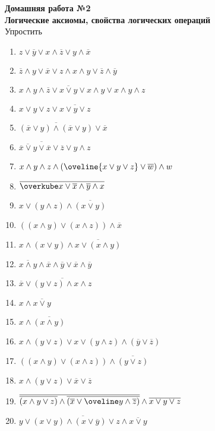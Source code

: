 



    \begin{center}
        \textbf{Домашняя работа №2 \\Логические аксиомы, свойства логических операций}\\
        Упростить
    \end{center}

    \begin{enumerate}
        \item $z \vee \overline y \vee x \wedge \overline z \vee y \wedge \overline x$
        \item $\overline z \wedge y \vee \overline x \vee z \wedge x \wedge y \vee \overline z \wedge \overline y$
        \item $x \wedge y \wedge \overline z \vee \overline{x \vee y} \vee x \wedge y \vee  x \wedge y \wedge z$
        \item $x \vee y \vee z \vee \overline{x \vee y \vee z}$
        \item $\overline{(\overline x \vee y) \wedge (\overline x \vee y)} \vee \overline x$
        \item $\overline{\overline{\overline x \vee y} \vee \overline x \vee \overline z} \vee y \wedge z$
        \item $x \wedge y \wedge z \wedge (\oveline{x \vee y \vee z} \vee \overline w) \wedge w$
        \item $\overline{\overkube x \vee \overline x \wedge \overline y \wedge x}$
        \item $x \vee (y \wedge z) \wedge \overline {(x \vee y)}$
        \item $((x \wedge y) \vee (x \wedge z)) \wedge \overline x$
        \item $x \wedge (x \vee y) \wedge \overline{x \vee (x \wedge y)}$
        \item $\overline {x \wedge y} \wedge \overline x \wedge \overline y \vee \overline x \wedge \overline y$
        \item $\overline x \vee \overline{(y \vee z) \wedge x \wedge z}$
        \item $x \wedge \overline {x \vee y}$
        \item $x \wedge \overline{(x \wedge y)}$
        \item $x \wedge (y \vee z) \vee x \vee (y \wedge z) \wedge (\overline y \vee \overline z)$
        \item $((x \wedge y) \vee (x \wedge z)) \wedge \overline{(y \vee z)}$
        \item $x \wedge (y \vee z) \vee \overline x \vee \overline z$
        \item $\overline{\overline{(x \wedge y \vee z)} \wedge \overline{(\overline x \vee \oveline y \wedge \overline z)}} \wedge \overline{x \vee y \vee z}$
        \item $\overline{y \vee (x \vee y) \wedge (x \vee \overline y) \vee z \wedge \overline{x \vee y}}$
    \end{enumerate}


